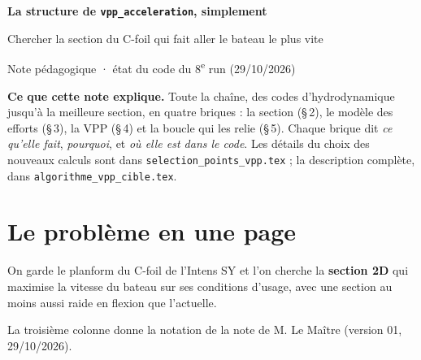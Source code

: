 \documentclass[11pt,a4paper]{article}
\newcommand{\py}[1]{\texttt{#1}}
\begin{document}
{\centering
{\Large\bfseries\color{blue!40!black} La structure de \py{vpp\_acceleration}, simplement\par}
\vspace{0.15em}
{\large Chercher la section du C-foil qui fait aller le bateau le plus vite\par}
\vspace{0.2em}
{\small Note pédagogique · état du code du 8\textsuperscript{e} run (29/10/2026)\par}}

\vspace{0.4em}
\textbf{Ce que cette note explique.} Toute la chaîne, des codes d'hydrodynamique jusqu'à la meilleure
section, en quatre briques : la section (§\,2), le modèle des efforts (§\,3), la VPP (§\,4) et la boucle qui
les relie (§\,5). Chaque brique dit \emph{ce qu'elle fait}, \emph{pourquoi}, et \emph{où elle est dans le
code}. Les détails du choix des nouveaux calculs sont dans \py{selection\_points\_vpp.tex} ; la description
complète, dans \py{algorithme\_vpp\_cible.tex}.

\section{Le problème en une page}
On garde le planform du C-foil de l'Intens SY et l'on cherche la \textbf{section 2D} qui maximise la vitesse
du bateau sur ses conditions d'usage, avec une section au moins aussi raide en flexion que l'actuelle.

La troisième colonne donne la notation de la note de M. Le Maître (version 01, 29/10/2026).
\end{document}
